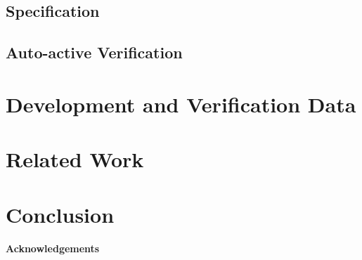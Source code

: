 \documentclass[11pt,a4paper]{article}
\begin{document}
\subsection{Specification}
\subsection{Auto-active Verification}

\section{Development and Verification Data}

\section{Related Work}

\section{Conclusion}


\paragraph*{Acknowledgements}




\end{document}
